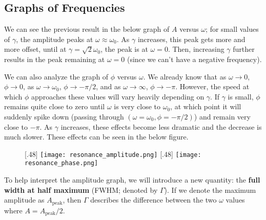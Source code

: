 \subsection*{Graphs of Frequencies}
We can see the previous result in the below graph of $A$ versus $\omega$; for small values of $\gamma$, the amplitude peaks at $\omega\approx\omega_0$. As $\gamma$ increases, this peak gets more and more offset, until at $\gamma = \sqrt2 \omega_0$, the peak is at $\omega = 0$. Then, increasing $\gamma$ further results in the peak remaining at $\omega =0$ (since we can't have a negative frequency). 

We can also analyze the graph of $\phi$ versus $\omega$. We already know that as $\omega\to 0$, $\phi\to 0$, as $\omega\to\omega_0$, $\phi\to -\pi/2$, and as $\omega\to\infty$, $\phi\to-\pi$. However, the speed at which $\phi$ approaches these values will vary heavily depending on $\gamma$. If $\gamma$ is small, $\phi$ remains quite close to zero until $\omega$ is very close to $\omega_0$, at which point it will suddenly spike down (passing through $(\omega = \omega_0, \phi = -\pi/2)$) and remain very close to $-\pi$. As $\gamma$ increases, these effects become less dramatic and the decrease is much slower. These effects can be seen in the below figure. 

\begin{figure}[t!]
  \subcaptionbox*{}[.48\linewidth]{
    \texttt{[image: resonance\_amplitude.png]}
  }
  \hfill
  \subcaptionbox*{}[.48\linewidth]{
    \texttt{[image: resonance\_phase.png]}
  }
\end{figure}

To help interpret the amplitude graph, we will introduce a new quantity: the \textbf{full width at half maximum} (FWHM; denoted by $\Gamma$). If we denote the maximum amplitude as $A_\text{peak}$, then $\Gamma$ describes the difference between the two $\omega$ values where $A = A_\text{peak}/2$. 

